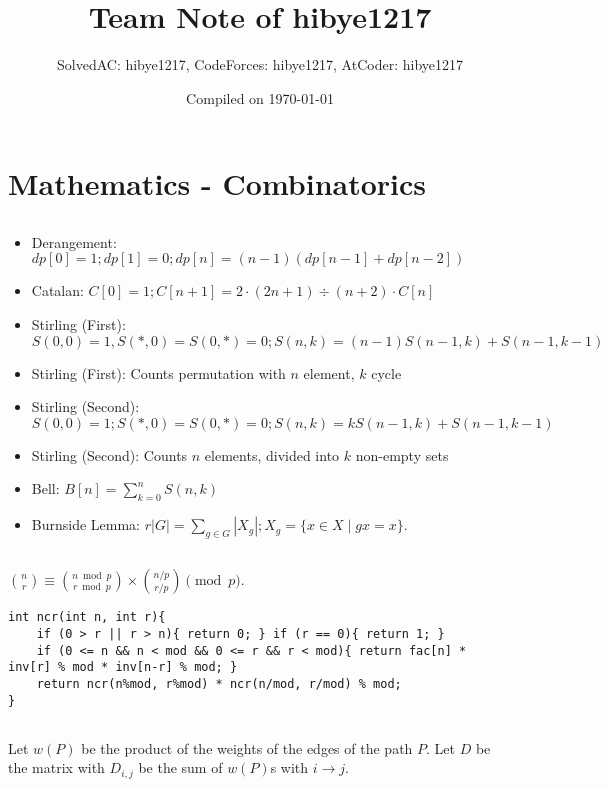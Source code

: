 \documentclass[landscape, 8pt, a4paper, oneside, twocolumn]{extarticle}
\title{Team Note of \textcolor{BOJ_RUBY_IV}{\textbf{hibye1217}}}
\author{SolvedAC: \textcolor{ARENA_SSP}{hibye1217}, CodeForces: \textcolor{CF_RED}{hibye1217}, AtCoder: \textcolor{AT_YELLOW}{hibye1217}}
\date{Compiled on \today}
\begin{document}
\thispagestyle{fancy}
\maketitlepage


\section{Mathematics - Combinatorics}
\subsection{}
\begin{itemize}
	\item Derangement: $dp[0] = 1; dp[1] = 0; dp[n] = (n-1)(dp[n-1] + dp[n-2])$
	\item Catalan: $C[0] = 1; C[n+1] = 2 \cdot (2n+1) \div (n+2) \cdot C[n]$
	\item Stirling (First): $S(0, 0) = 1, S(*, 0) = S(0, *) = 0; S(n, k) = (n-1) S(n-1, k) + S(n-1, k-1)$
	\item Stirling (First): Counts permutation with $n$ element, $k$ cycle
	\item Stirling (Second): $S(0, 0) = 1; S(*, 0) = S(0, *) = 0; S(n, k) = kS(n-1, k) + S(n-1, k-1)$
	\item Stirling (Second): Counts $n$ elements, divided into $k$ non-empty sets
	\item Bell: $B[n] = \sum\limits_{k=0}^{n} S(n, k)$
	\item Burnside Lemma: $r|G| = \sum_{g \in G} |X_g|; X_g = \{x \in X \mid gx = x\}$.
\end{itemize}
\subsection{}
$\binom{n}{r} \equiv \binom{n \bmod p}{r \bmod p} \times \binom{n/p}{r/p} \pmod p$.
\begin{verbatim}
int ncr(int n, int r){
	if (0 > r || r > n){ return 0; } if (r == 0){ return 1; }
	if (0 <= n && n < mod && 0 <= r && r < mod){ return fac[n] * inv[r] % mod * inv[n-r] % mod; }
	return ncr(n%mod, r%mod) * ncr(n/mod, r/mod) % mod;
}
\end{verbatim}
\subsection{}
Let $w(P)$ be the product of the weights of the edges of the path $P$. Let $D$ be the matrix with $D_{i,j}$ be the sum of $w(P)$s with $i \to j$.
\end{document}

